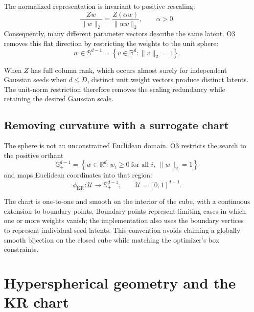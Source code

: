 \documentclass[11pt]{article}
\newcommand{\R}{\mathbb{R}}
\newcommand{\sphere}{\mathbb{S}}
\newcommand{\norm}[1]{\lVert #1 \rVert_2}
\begin{document}
The normalized representation is invariant to positive rescaling:
\begin{equation}
    \frac{Zw}{\norm{w}}
    =\frac{Z(\alpha w)}{\norm{\alpha w}},
    \qquad \alpha>0.
    \label{eq:scaling-redundancy}
\end{equation}
Consequently, many different parameter vectors describe the same latent.  O3
removes this flat direction by restricting the weights to the unit sphere:
\begin{equation}
    w\in\sphere^{d-1}
    =\left\{v\in\R^d:\norm{v}=1\right\}.
    \label{eq:unit-sphere}
\end{equation}

When \(Z\) has full column rank, which occurs almost surely for independent
Gaussian seeds when \(d\leq D\), distinct unit weight vectors produce
distinct latents.  The unit-norm restriction therefore removes the scaling
redundancy while retaining the desired Gaussian scale.

\subsection{Removing curvature with a surrogate chart}

The sphere is not an unconstrained Euclidean domain.  O3 restricts the search
to the positive orthant
\begin{equation}
    \sphere^{d-1}_{+}
    =\left\{w\in\R^d:w_i\geq 0\ \text{for all }i,\ \norm{w}=1\right\}
    \label{eq:positive-sphere}
\end{equation}
and maps Euclidean coordinates into that region:
\begin{equation}
    \phi_{\mathrm{KR}}: \mathcal{U}\longrightarrow\sphere^{d-1}_{+},
    \qquad \mathcal{U}=[0,1]^{d-1}.
    \label{eq:kr-chart}
\end{equation}

The chart is one-to-one and smooth on the interior of the cube, with a
continuous extension to boundary points.  Boundary points represent limiting
cases in which one or more weights vanish; the implementation also uses the
boundary vertices to represent individual seed latents.  This convention
avoids claiming a globally smooth bijection on the closed cube while matching
the optimizer's box constraints.

\section{Hyperspherical geometry and the KR chart}
\label{sec:kr-chart}
\end{document}
